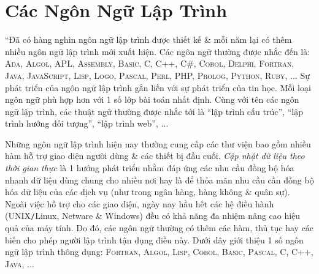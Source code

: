 \documentclass[oneside]{book}
\numberwithin{equation}{section}
\begin{document}
\section{Các Ngôn Ngữ Lập Trình}
``Đã có hàng nghìn ngôn ngữ lập trình được thiết kế \& mỗi năm lại có thêm nhiều ngôn ngữ lập trình mới xuất hiện. Các ngôn ngữ thường được nhắc đến là: \textsc{Ada, Algol, APL, Assembly, Basic, C, C++, C\#, Cobol, Delphi, Fortran, Java, JavaScript, Lisp, Logo, Pascal, Perl, PHP, Prolog, Python, Ruby}, $\ldots$ Sự phát triển của ngôn ngữ lập trình gắn liền với sự phát triển của tin học. Mỗi loại ngôn ngữ phù hợp hơn với 1 số lớp bài toán nhất định. Cùng với tên các ngôn ngữ lập trình, các thuật ngữ thường được nhắc tới là ``lập trình cấu trúc'', ``lập trình hướng đối tượng'', ``lập trình web'', $\ldots$

Những ngôn ngữ lập trình hiện nay thường cung cấp các thư viện bao gồm nhiều hàm hỗ trợ giao diện người dùng \& các thiết bị đầu cuối. \textit{Cập nhật dữ liệu theo thời gian thực} là 1 hướng phát triển nhằm đáp ứng các nhu cầu đồng bộ hóa nhanh dữ liệu dùng chung cho nhiều nơi hay là để thỏa mãn nhu cầu cần đồng bộ hóa dữ liệu của các dịch vụ (như trong ngân hàng, hàng không \& quân sự). Ngoài việc hỗ trợ cho các giao diện, ngày nay hầu hết các hệ điều hành (UNIX\texttt{/}Linux, Netware \& Windows) đều có khả năng đa nhiệm nâng cao hiệu quả của máy tính. Do đó, các ngôn ngữ thường có thêm các hàm, thủ tục hay các biến cho phép người lập trình tận dụng điều này. Dưới dây giới thiệu 1 số ngôn ngữ lập trình thông dụng: \textsc{Fortran, Algol, Lisp, Cobol, Basic, Pascal, C, C++, Java}, $\ldots$
\end{document}
